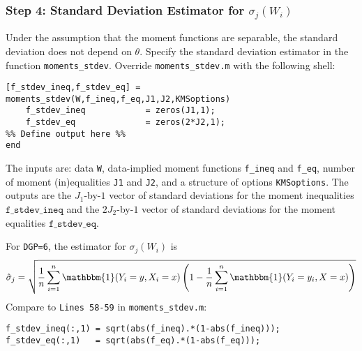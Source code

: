 \documentclass[12pt]{article}
\def\code#1{\texttt{#1}}
\begin{document}
\subsubsection*{Step 4: Standard Deviation Estimator for $\sigma_j(W_i)$}
Under the assumption that the moment functions are separable, the standard deviation does not depend on $\theta$.  Specify the standard deviation estimator in the function \code{moments\_stdev}.  Override  \code{moments\_stdev.m} with the following shell:
\footnotesize
\begin{lstlisting}[backgroundcolor = \color{gray!30},
                   xleftmargin = 0cm,
                   framexleftmargin = 1em]
[f_stdev_ineq,f_stdev_eq] = moments_stdev(W,f_ineq,f_eq,J1,J2,KMSoptions)
    f_stdev_ineq            = zeros(J1,1);
    f_stdev_eq              = zeros(2*J2,1);
%% Define output here %%
end
\end{lstlisting} \normalsize
The inputs are: data \code{W}, data-implied moment functions \code{f\_ineq} and \code{f\_eq}, number of moment (in)equalities \code{J1} and \code{J2}, and a structure of options \code{KMSoptions}.  The outputs are the $J_1$-by-$1$ vector of standard deviations for the moment inequalities $\code{f\_stdev\_ineq}$ and the $2J_2$-by-$1$ vector of standard deviations for the moment equalities $\code{f\_stdev\_eq}$.

For  \code{DGP=6}, the estimator for $\sigma_j(W_i)$ is
\begin{align*}
\hat \sigma_{j} = \sqrt{ \frac{1}{n}\sum_{i=1}^n \mathbbm{1}(Y_i = y, X_i=x) \left(1 - \frac{1}{n}\sum_{i=1}^n \mathbbm{1}(Y_i = y_i, X=x)  \right)}
\end{align*}
Compare to \code{Lines 58-59} in \code{moments\_stdev.m}:
\footnotesize
    \begin{lstlisting}[backgroundcolor = \color{gray!30},
                   xleftmargin = 0cm,
                   framexleftmargin = 1em]
f_stdev_ineq(:,1) = sqrt(abs(f_ineq).*(1-abs(f_ineq)));
f_stdev_eq(:,1)   = sqrt(abs(f_eq).*(1-abs(f_eq)));
    \end{lstlisting}\normalsize
\end{document}
